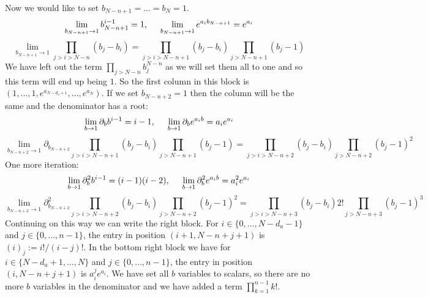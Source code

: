 \documentclass{article}
\begin{document}
Now we would like to set $b_{N-n+1} = ... = b_{N} = 1$. 
\[ \lim_{b_{N-n+1} \to 1} b_{N-n+1}^{i-1} = 1, \hspace{5mm} \lim_{b_{N-n+1} \to 1} e^{a_{i} b_{N-n+1}} = e^{a_{i}}     \]
\[ \lim_{b_{N-n+1} \to 1} \prod_{j > i > N-n} (b_{j} - b_{i}) = \prod_{j > i > N-n+1} (b_{j} - b_{i}) \prod_{j > N-n+1} (b_{j} - 1)    \]
We have left out the term $\prod_{j > N-n} b_{j}^{N-n}$ as we will set them all to one and so this term will end up being $1$. So the first column in this block is $(1, ..., 1, e^{a_{N-d_{a}+1}}, ..., e^{a_{N}})$. If we set $b_{N-n+2} = 1$ then the column will be the same and the denominator has a root:
\[ \lim_{b \to 1} \partial_{b} b^{i-1} = i-1, \hspace{5mm} \lim_{b \to 1} \partial_{b} e^{a_{i} b} = a_{i} e^{a_{i}}    \]
\[ \lim_{b_{N-n+2} \to 1} \partial_{b_{N-n+2}} \prod_{j > i > N-n+1} (b_{j} - b_{i}) \prod_{j > N-n+1} (b_{j} - 1) = \prod_{j > i > N-n+2} (b_{j} - b_{i}) \prod_{j > N-n+2} (b_{j} - 1)^{2}   \]
One more iteration:
\[ \lim_{b \to 1} \partial_{b}^{2} b^{i-1} = (i-1)(i-2), \hspace{5mm} \lim_{b \to 1} \partial_{b}^{2} e^{a_{i} b} = a_{i}^{2} e^{a_{i}}    \]
\[ \lim_{b_{N-n+3} \to 1} \partial_{b_{N-n+2}}^{2} \prod_{j > i > N-n+2} (b_{j} - b_{i}) \prod_{j > N-n+2} (b_{j} - 1)^{2} = \prod_{j > i > N-n+3} (b_{j} - b_{i}) 2! \prod_{j > N-n+3} (b_{j}-1)^{3}  \]
Continuing on this way we can write the right block. For $i \in \{0, ..., N-d_{a}-1\}$ and $j \in \{0, ..., n-1\}$, the entry in position $(i+1, N-n+j+1)$ is $(i)_{j} := i! / (i-j)!$. In the bottom right block we have for $i \in \{N-d_{a}+1, ..., N\}$ and $j \in \{0, ..., n-1\}$, the entry in position $(i,N-n+j+1)$ is $a_{i}^{j} e^{a_{i}}$. We have set all $b$ variables to scalars, so there are no more $b$ variables in the denominator and we have added a term $\prod_{k=1}^{n-1} k!$. 
\end{document}
